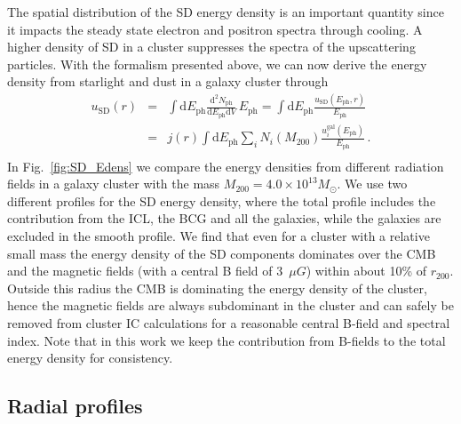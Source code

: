 \documentclass[10pt,aps,pra,reprint,amsmath,amsfonts,amssymb,showpacs,nofootinbib,floatfix]{revtex4-1}
\newcommand{\rmn}{\mathrm}
\newcommand{\ph}{\rmn{ph}}
\newcommand{\eph}{E_\ph}
\newcommand{\gal}{\rmn{gal}}
\newcommand{\sd}{\rmn{SD}}
\newcommand{\msun}{M_\odot}
\newcommand{\dd}{\rmn{d}}
\newcommand{\rvir}{r_{200}}
\newcommand{\mvir}{M_{200}}
\begin{document}
The spatial distribution of the SD energy density is an important quantity since
it impacts the steady state electron and positron spectra through cooling. A
higher density of SD in a cluster suppresses the spectra of the upscattering
particles. With the formalism presented above, we can now derive the energy
density from starlight and dust in a galaxy cluster through
\begin{eqnarray}
\label{eq:U_SD}
u_\sd(r) &=& \int \dd \eph \frac{\dd^2 N_\ph}{\dd \eph \dd V}\,\eph
=\int \dd \eph \frac{u_\sd(\eph, r)}{\eph}
\nonumber \\
&=&  j(r)  \int \dd \eph \sum_i 
N_i(\mvir) \frac{u_i^\gal(\eph)}{\eph}\,. \nonumber \\
\end{eqnarray}
In Fig.~\ref{fig:SD_Edens} we compare the energy densities from
different radiation fields in a galaxy cluster with the mass
$\mvir=4.0\times10^{13}\msun$. We use two different profiles for the
SD energy density, where the total profile includes the contribution
from the ICL, the BCG and all the galaxies, while the galaxies are
excluded in the smooth profile. We find that even for a cluster with a
relative small mass the energy density of the SD components dominates
over the CMB and the magnetic fields (with a central B field of 3~$\mu
G$) within about 10\% of $\rvir$. Outside this radius the CMB is
dominating the energy density of the cluster, hence the magnetic
fields are always subdominant in the cluster and can safely be removed
from cluster IC calculations for a reasonable central B-field and
spectral index. Note that in this work we keep the contribution
from B-fields to the total energy density for consistency.


\subsection{Radial profiles}
\end{document}
